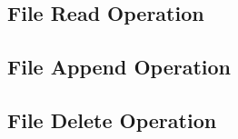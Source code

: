 \documentclass[]{article}
\newcommand{\hl}[1]{\textcolor{notecolor}{#1}}
\begin{document}
{%
%
%

\subsection{File Read Operation}

\subsection{File Append Operation}

\subsection{File Delete Operation}




%
%
%
%
%


}
\end{document}
